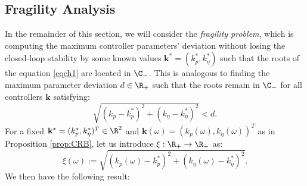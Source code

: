 \documentclass[twoside,reqno,11pt]{fcaa-var} %
\begin{document}
\subsection{Fragility Analysis}
In the remainder of this section, we will consider the \textit{fragility problem}, which is computing the maximum controller parameters' deviation without losing the closed-loop stability by some known values $\mathbf{k}^*=\left(k_p^*,k_\eta^*\right)$ such that the roots of the equation \eqref{eqch1} are located in ${\C}_{-}$. This is analogous to finding the maximum parameter deviation $d\in\R_+$ such that the roots remain in $\C_-$ for all controllers $\mathbf{k}$ satisfying:
\begin{equation}
\sqrt{(k_p-k_p^*)^2+(k_\eta-k_\eta^*)^2}<d.
\end{equation}
For a fixed $\mathbf{k}^*=(k_p^*,k_\eta^*)^T\in\R^2$ and $\mathbf{k}(\omega)=(k_p(\omega),k_\eta(\omega))^T$ as in Proposition \ref{prop:CRB}, let us introduce $\xi:\R_+\rightarrow\R_+$ as:
\begin{equation}
\xi(\omega):=\sqrt{(k_p(\omega)-k_p^*)^2+(k_\eta(\omega)-k_\eta^*)^2}. \label{eqfragilitya}
\end{equation}
We then have the following result:
\end{document}
